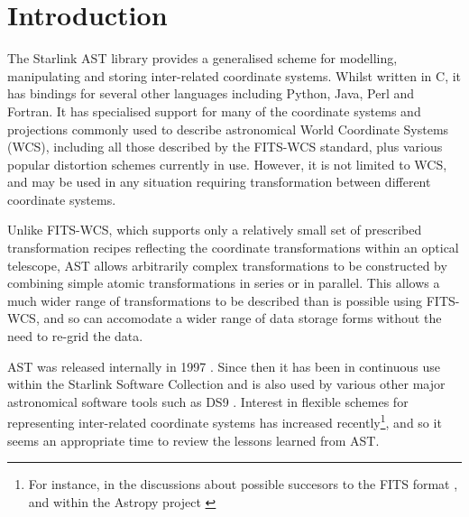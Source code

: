 \documentclass[final,authoryear,5p,times,twocolumn]{elsarticle}
\begin{document}

\newcommand{\mnras}{Mon Not R Astron Soc}
\newcommand{\aap}{Astron Astrophys}
\newcommand{\aaps}{Astron Astrophys Supp}
\newcommand{\pasp}{Pub Astron Soc Pacific}
\newcommand{\apj}{Astrophys J}
\newcommand{\apjs}{Astrophys J Supp}
\newcommand{\qjras}{Quart J R Astron Soc}
\newcommand{\an}{Astron.\ Nach.}
\newcommand{\ijimw}{Int.\ J.\ Infrared \& Millimeter Waves}
\newcommand{\procspie}{Proc.\ SPIE}
\newcommand{\aspconf}{ASP Conf. Ser.}

\newcommand{\ascl}[1]{\href{http://www.ascl.net/#1}{ascl:#1}}

\section{Introduction}
\label{sec:intro}

The Starlink AST library \citep[][\ascl{1404.016}]{SUN211} provides a
generalised scheme for modelling, manipulating and storing inter-related
coordinate systems. Whilst written in C, it has bindings for several
other languages including Python, Java, Perl and Fortran. It has
specialised support for many of the coordinate systems and projections
commonly used to describe astronomical World Coordinate Systems (WCS),
including all those described by the FITS-WCS standard, plus various
popular distortion schemes currently in use. However, it is not limited
to WCS, and may be used in any situation requiring transformation between
different coordinate systems.

Unlike FITS-WCS, which supports only a relatively small set of prescribed
transformation recipes reflecting the coordinate transformations within
an optical telescope, AST allows arbitrarily complex transformations to be
constructed by combining simple atomic transformations in series or in
parallel. This allows a much wider range of transformations to be
described than is possible using FITS-WCS, and so can accomodate a wider
range of data storage forms without the need to re-grid the data.

AST was released internally in 1997 \cite[][included in ``Twenty Years of
ADASS'' \nocite{adass20}]{1998ASPC..145...41W}. Since then it has been in
continuous use within the Starlink Software Collection \citep[][\ascl{1110.012}]{2014ASPC..485..391C}
and is also used by various other major astronomical software tools such as
DS9 \citep[][\ascl{0003.002}]{2003ASPC..295..489J}. Interest in flexible schemes for representing
inter-related coordinate systems has increased recently\footnote{For
instance, in the discussions about possible succesors to the FITS format \citep{2015Mink},
and within the Astropy project \citep{2013A&A...558A..33A}}, and so it seems an appropriate time to
review the lessons learned from AST.
\end{document}
